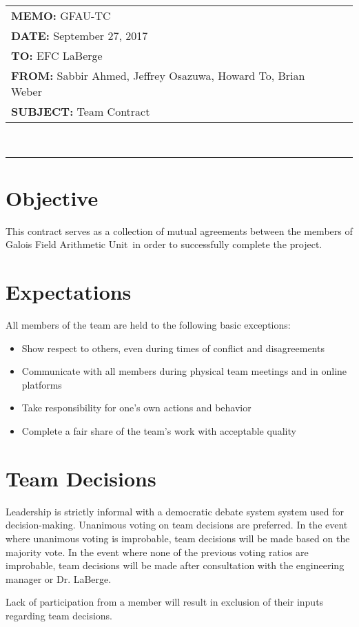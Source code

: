 \documentclass[paper=usletter, fontsize=12pt]{article}
\newcommand{\team}{Galois Field Arithmetic Unit}
\newcommand{\Sabbir}{Sabbir Ahmed}
\newcommand{\Jeffrey}{Jeffrey Osazuwa}
\newcommand{\Howard}{Howard To}
\newcommand{\Brian}{Brian Weber}
\newcommand{\documentinfo}[5]{
    \begin{centering}
        \parbox{6.8in}{
        \begin{spacing}{1}
            \begin{flushleft}
                \begin{tabular}{l l}
                    #1 \\
                    #2 \\
                    #3 \\
                    #4 \\
                    #5 \\
                \end{tabular}\\
                \rule{\textwidth}{1pt}
            \end{flushleft}
        \end{spacing}
        }
    \end{centering}
}
\begin{document}
    \documentinfo{\textbf{MEMO:} GFAU-TC}{\textbf{DATE: }{September 27, 2017}}{\textbf{TO: } EFC LaBerge}{\textbf{FROM: }\Sabbir, \Jeffrey, \Howard, \Brian}{\textbf{SUBJECT: } Team Contract}

    \vspace{-0.3in}
    \section{Objective}

        This contract serves as a collection of mutual agreements between the members of \team \ in order to successfully complete the project.

    \section{Expectations}

        All members of the team are held to the following basic exceptions:

        \begin{itemize}

            \item Show respect to others, even during times of conflict and disagreements
            \item Communicate with all members during physical team meetings and in online platforms
            \item Take responsibility for one’s own actions and behavior
        \item Complete a fair share of the team's work with acceptable quality

        \end{itemize}

    \section{Team Decisions}

        Leadership is strictly informal with a democratic debate system system used for decision-making. Unanimous voting on team decisions are preferred. In the event where unanimous voting is improbable, team decisions will be made based on the majority vote. In the event where none of the previous voting ratios are improbable, team decisions will be made after consultation with the engineering manager or Dr. LaBerge. 

        Lack of participation from a member will result in exclusion of their inputs regarding team decisions. 
\end{document}
